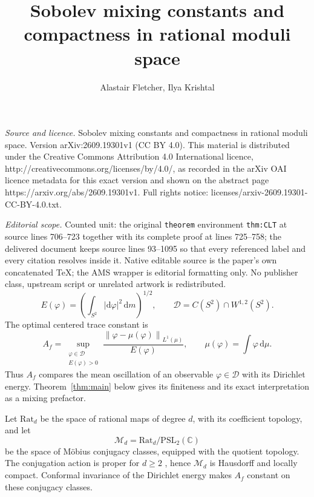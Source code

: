 \documentclass[10pt,a4paper]{amsart}
\newcommand{\C}{\mathbb C}
\newcommand{\E}{\mathbb E}
\newcommand{\Dcal}{\mathcal D}
\newcommand{\norm}[1]{\left\lVert #1\right\rVert}
\newcommand{\dd}{\mathrm d}
\numberwithin{equation}{section}
\begin{document}
\title[Sobolev mixing constants and compactness in rational moduli ]{Sobolev mixing constants and compactness in rational moduli space}
\author{Alastair Fletcher, Ilya Krishtal}
\date{}
\maketitle
\noindent\emph{Source and licence.} Sobolev mixing constants and compactness in rational moduli space. Version arXiv:2609.19301v1 (CC BY 4.0). This material is distributed under the Creative Commons Attribution 4.0 International licence, http://creativecommons.org/licenses/by/4.0/, as recorded in the arXiv OAI licence metadata for this exact version and shown on the abstract page https://arxiv.org/abs/2609.19301v1. Full rights notice: licenses/arxiv-2609.19301-CC-BY-4.0.txt.\par\smallskip
\noindent\textit{Editorial scope.} Counted unit: the original \texttt{theorem} environment \texttt{thm:CLT} at source lines 706--723 together with its complete proof at lines 725--758; the delivered document keeps source lines 93--1095 so that every referenced label and every citation resolves inside it. Native editable source is the paper's own concatenated TeX; the AMS wrapper is editorial formatting only. No publisher class, upstream script or unrelated artwork is redistributed.
\begin{equation}\label{eq:rational-energy}
 E(\varphi)=\left(\int_{S^2}|\dd\varphi|^2\,\dd m\right)^{1/2},
 \qquad \Dcal=C(S^2)\cap W^{1,2}(S^2).
\end{equation}
The optimal centered trace constant is
\begin{equation}\label{eq:optimal-trace}
 A_f=\sup_{\substack{\varphi\in\Dcal\\E(\varphi)>0}}
 \frac{\norm{\varphi-\mu(\varphi)}_{L^1(\mu)}}{E(\varphi)},
 \qquad \mu(\varphi)=\int\varphi\,\dd\mu.
\end{equation}
Thus $A_f$ compares the mean oscillation of an observable $\varphi\in\Dcal$ with its Dirichlet energy. Theorem~\ref{thm:main} below gives its finiteness and its exact interpretation as a mixing prefactor.

Let $\mathrm{Rat}_d$ be the space of rational maps of degree $d$, with its coefficient topology, and let
\[
 \mathcal M_d=\mathrm{Rat}_d/\mathrm{PSL}_2(\C)
\]
be the space of M\"obius conjugacy classes, equipped with the quotient topology. The conjugation action is proper for $d\ge2$ \cite[Lemma 4.3]{BFN22}, hence $\mathcal M_d$ is Hausdorff and locally compact. Conformal invariance of the Dirichlet energy makes $A_f$ constant on these conjugacy classes.
\end{document}
